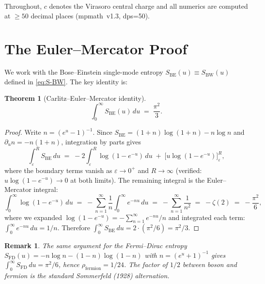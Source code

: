 \documentclass[12pt]{article}
\newtheorem{theorem}{Theorem}
\newtheorem{remark}{Remark}
\begin{document}
Throughout, $c$ denotes the Virasoro central charge and all numerics
are computed at $\geq 50$ decimal places (mpmath~v1.3, dps=50).

\section{The Euler--Mercator Proof}

We work with the Bose--Einstein single-mode entropy
$S_{\mathrm{BE}}(u) \equiv S_{\mathrm{BW}}(u)$ defined in
\eqref{eq:S-BW}.  The key identity is:

\begin{theorem}[Carlitz--Euler--Mercator identity]
\label{thm:carlitz}
\begin{equation}
  \int_0^\infty S_{\mathrm{BE}}(u)\,du \;=\; \frac{\pi^2}{3}.
\label{eq:carlitz}
\end{equation}
\end{theorem}

\begin{proof}
Write $n = (e^u-1)^{-1}$.  Since
$S_{\mathrm{BE}} = (1+n)\log(1+n) - n\log n$ and
$\partial_u n = -n(1+n)$, integration by parts gives
\[
  \int_\varepsilon^R S_{\mathrm{BE}}\,du
  \;=\; -2\int_\varepsilon^R \log(1-e^{-u})\,du
        \;+\; \bigl[u\log(1-e^{-u})\bigr]_\varepsilon^R,
\]
where the boundary terms vanish as $\varepsilon\to 0^+$ and $R\to\infty$
(verified: $u\log(1-e^{-u})\to 0$ at both limits).  The remaining integral
is the Euler--Mercator integral:
\begin{equation}
  \int_0^\infty \log(1-e^{-u})\,du
  \;=\; -\sum_{n=1}^\infty \frac{1}{n} \int_0^\infty e^{-nu}\,du
  \;=\; -\sum_{n=1}^\infty \frac{1}{n^2}
  \;=\; -\zeta(2)
  \;=\; -\frac{\pi^2}{6},
\label{eq:mercator}
\end{equation}
where we expanded $\log(1-e^{-u}) = -\sum_{n=1}^\infty e^{-nu}/n$ and
integrated each term: $\int_0^\infty e^{-nu}\,du = 1/n$.  Therefore
$\int_0^\infty S_{\mathrm{BE}}\,du = 2\cdot(\pi^2/6) = \pi^2/3$.
\end{proof}

\begin{remark}
The same argument for the Fermi--Dirac entropy
$S_{\mathrm{FD}}(u) = -n\log n - (1-n)\log(1-n)$ with $n=(e^u+1)^{-1}$
gives $\int_0^\infty S_{\mathrm{FD}}\,du = \pi^2/6$, hence
$\rho_{\mathrm{fermion}} = 1/24$.  The factor of $1/2$ between boson and
fermion is the standard Sommerfeld (1928) alternation.
\end{remark}
\end{document}
